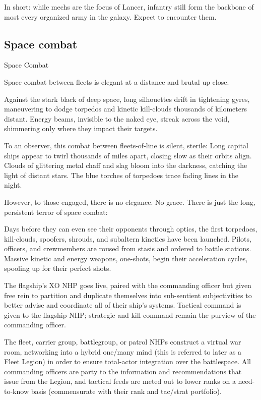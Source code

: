 In short: while mechs are the focus of Lancer, infantry still form the backbone of most every
organized army in the galaxy. Expect to encounter them.

\subsection{Space combat}
Space Combat

Space combat between fleets is elegant at a distance and brutal up close.


Against the stark black of deep space, long silhouettes drift in tightening gyres, maneuvering to
dodge torpedos and kinetic kill-clouds thousands of kilometers distant. Energy beams, invisible
to the naked eye, streak across the void, shimmering only where they impact their targets.


To an observer, this combat between fleets-of-line is silent, sterile: Long capital ships appear to
twirl thousands of miles apart, closing slow as their orbits align. Clouds of glittering metal chaff
and slag bloom into the darkness, catching the light of distant stars. The blue torches of
torpedoes trace fading lines in the night.





However, to those engaged, there is no elegance. No grace. There is just the long, persistent
terror of space combat:


Days before they can even see their opponents through optics, the first torpedoes, kill-clouds,
spoofers, shrouds, and subaltern kinetics have been launched. Pilots, officers, and
crewmembers are roused from stasis and ordered to battle stations. Massive kinetic and energy
weapons, one-shots, begin their acceleration cycles, spooling up for their perfect shots.


The flagship’s XO NHP goes live, paired with the commanding officer but given free rein to
partition and duplicate themselves into sub-sentient subjectivities to better advise and
coordinate all of their ship’s systems. Tactical command is given to the flagship NHP; strategic
and kill command remain the purview of the commanding officer.


The fleet, carrier group, battlegroup, or patrol NHPs construct a virtual war room, networking into
a hybrid one/many mind (this is referred to later as a Fleet Legion) in order to ensure total-actor
integration over the battlespace. All commanding officers are party to the information and
recommendations that issue from the Legion, and tactical feeds are meted out to lower ranks on
a need-to-know basis (commensurate with their rank and tac/strat portfolio).


